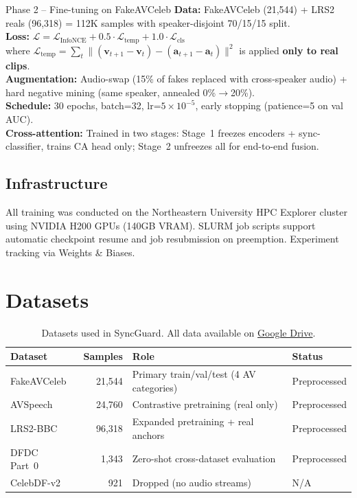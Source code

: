 \documentclass[12pt, letterpaper]{article}
\begin{document}
\begin{infobox}{Phase 2 -- Fine-tuning on FakeAVCeleb}
\textbf{Data:} FakeAVCeleb (21,544) + LRS2 reals (96,318) = 112K samples with speaker-disjoint 70/15/15 split.\\
\textbf{Loss:} $\mathcal{L} = \mathcal{L}_\text{InfoNCE} + 0.5 \cdot \mathcal{L}_\text{temp} + 1.0 \cdot \mathcal{L}_\text{cls}$\\
where $\mathcal{L}_\text{temp} = \sum_t \|(\mathbf{v}_{t+1} - \mathbf{v}_t) - (\mathbf{a}_{t+1} - \mathbf{a}_t)\|^2$ is applied \textbf{only to real clips}.\\
\textbf{Augmentation:} Audio-swap (15\% of fakes replaced with cross-speaker audio) + hard negative mining (same speaker, annealed 0\%$\to$20\%).\\
\textbf{Schedule:} 30 epochs, batch=32, lr=$5 \times 10^{-5}$, early stopping (patience=5 on val AUC).\\
\textbf{Cross-attention:} Trained in two stages: Stage~1 freezes encoders + sync-classifier, trains CA head only; Stage~2 unfreezes all for end-to-end fusion.
\end{infobox}

\subsection{Infrastructure}

All training was conducted on the Northeastern University HPC Explorer cluster using NVIDIA H200 GPUs (140GB VRAM). SLURM job scripts support automatic checkpoint resume and job resubmission on preemption. Experiment tracking via Weights \& Biases.

\section{Datasets}

\renewcommand{\arraystretch}{1.5}
\begin{table}[H]
\centering
\begin{tabularx}{\textwidth}{@{} p{2.8cm} r X p{2.5cm} @{}}
\toprule
\textbf{Dataset} & \textbf{Samples} & \textbf{Role} & \textbf{Status} \\
\midrule
FakeAVCeleb~\cite{khalid2021} & 21,544 & Primary train/val/test (4 AV categories) & Preprocessed \\
AVSpeech & 24,760 & Contrastive pretraining (real only) & Preprocessed \\
LRS2-BBC & 96,318 & Expanded pretraining + real anchors & Preprocessed \\
DFDC Part~0~\cite{dolhansky2020} & 1,343 & Zero-shot cross-dataset evaluation & Preprocessed \\
CelebDF-v2~\cite{li2020} & 921 & Dropped (no audio streams) & N/A \\
\bottomrule
\end{tabularx}
\caption{Datasets used in SyncGuard. All data available on \href{https://drive.google.com/drive/folders/1wQ9cdWo5R9O8ZvwPO7XUnfMvVOgoIF1E}{Google Drive}.}
\end{table}
\renewcommand{\arraystretch}{1.0}
\end{document}
